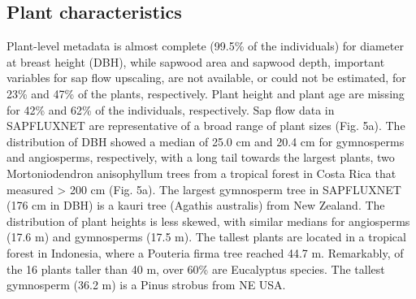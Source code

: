 \documentclass[11pt,twoside]{reedthesis}
\begin{document}
\subsection{Plant characteristics}\label{plant-characteristics}

Plant-level metadata is almost complete (99.5\% of the individuals) for
diameter at breast height (DBH), while sapwood area and sapwood depth,
important variables for sap flow upscaling, are not available, or could
not be estimated, for 23\% and 47\% of the plants, respectively. Plant
height and plant age are missing for 42\% and 62\% of the individuals,
respectively. Sap flow data in SAPFLUXNET are representative of a broad
range of plant sizes (Fig. 5a). The distribution of DBH showed a median
of 25.0 cm and 20.4 cm for gymnosperms and angiosperms, respectively,
with a long tail towards the largest plants, two Mortoniodendron
anisophyllum trees from a tropical forest in Costa Rica that measured
\textgreater{} 200 cm (Fig. 5a). The largest gymnosperm tree in
SAPFLUXNET (176 cm in DBH) is a kauri tree (Agathis australis) from New
Zealand. The distribution of plant heights is less skewed, with similar
medians for angiosperms (17.6 m) and gymnosperms (17.5 m). The tallest
plants are located in a tropical forest in Indonesia, where a Pouteria
firma tree reached 44.7 m. Remarkably, of the 16 plants taller than 40
m, over 60\% are Eucalyptus species. The tallest gymnosperm (36.2 m) is
a Pinus strobus from NE USA.\par
\end{document}
